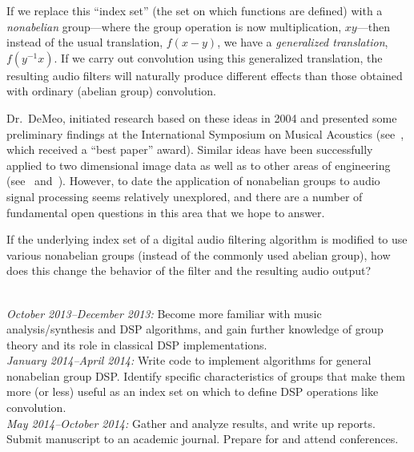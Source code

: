 \documentclass[11pt]{article}
\begin{document}
If we replace this ``index set'' (the set on which functions are defined) with a
\emph{nonabelian} group---where the group operation is now multiplication,
$xy$---then instead of the usual translation, $f(x-y)$, we have a
\emph{generalized translation}, $f(y^{-1}x)$. 
If we carry out convolution using this generalized translation, the
resulting audio filters will naturally produce different effects than those
obtained with ordinary (abelian group) convolution.  


Dr.~DeMeo, initiated research based on these ideas in
2004 and presented some preliminary findings at the International Symposium on Musical
Acoustics (see~\cite{nonabeliandsp}, which received a ``best paper'' award).
Similar ideas have been successfully applied to two dimensional image data
as well as to other areas of engineering (see~\cite{Chirikjian:2002}
and~\cite{Tolimieri:2003}).  However, to date the application of 
nonabelian groups to audio signal processing seems relatively unexplored, and
there are a number of fundamental open questions in this area that we hope to
answer.  
 
\vskip5mm

If the underlying index set of a digital audio filtering algorithm is modified
to use various nonabelian groups (instead of the commonly used abelian group),
how does this change the behavior of the filter and the resulting audio output?

\vskip5mm

\\
{\it October 2013--December 2013:} Become more familiar with music
analysis/synthesis and \ac{DSP} algorithms, and gain further knowledge of group
theory and its role in classical \ac{DSP} implementations. 
\\[5pt]
{\it January 2014--April 2014:} Write code to implement algorithms for
general nonabelian group \ac{DSP}.  
Identify specific characteristics of groups that make them more (or less)
useful as an index set on which to define \ac{DSP} operations like convolution.
\\[5pt]
{\it May 2014--October 2014:} Gather and analyze results, and write up reports.  
Submit manuscript to an academic journal.  Prepare
for and attend conferences.
\end{document}
